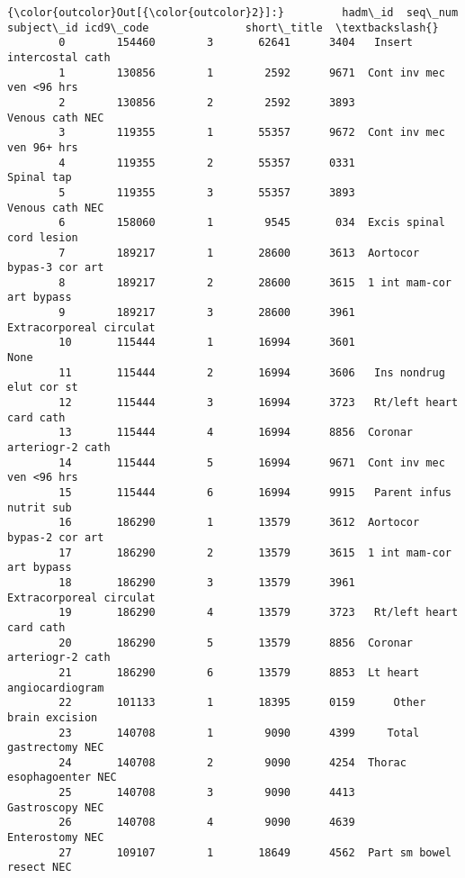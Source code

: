 \documentclass[11pt]{article}
\begin{document}
\begin{Verbatim}[commandchars=\\\{\}]
{\color{outcolor}Out[{\color{outcolor}2}]:}         hadm\_id  seq\_num  subject\_id icd9\_code               short\_title  \textbackslash{}
        0        154460        3       62641      3404   Insert intercostal cath   
        1        130856        1        2592      9671  Cont inv mec ven <96 hrs   
        2        130856        2        2592      3893           Venous cath NEC   
        3        119355        1       55357      9672  Cont inv mec ven 96+ hrs   
        4        119355        2       55357      0331                Spinal tap   
        5        119355        3       55357      3893           Venous cath NEC   
        6        158060        1        9545       034  Excis spinal cord lesion   
        7        189217        1       28600      3613  Aortocor bypas-3 cor art   
        8        189217        2       28600      3615  1 int mam-cor art bypass   
        9        189217        3       28600      3961   Extracorporeal circulat   
        10       115444        1       16994      3601                      None   
        11       115444        2       16994      3606   Ins nondrug elut cor st   
        12       115444        3       16994      3723   Rt/left heart card cath   
        13       115444        4       16994      8856  Coronar arteriogr-2 cath   
        14       115444        5       16994      9671  Cont inv mec ven <96 hrs   
        15       115444        6       16994      9915   Parent infus nutrit sub   
        16       186290        1       13579      3612  Aortocor bypas-2 cor art   
        17       186290        2       13579      3615  1 int mam-cor art bypass   
        18       186290        3       13579      3961   Extracorporeal circulat   
        19       186290        4       13579      3723   Rt/left heart card cath   
        20       186290        5       13579      8856  Coronar arteriogr-2 cath   
        21       186290        6       13579      8853  Lt heart angiocardiogram   
        22       101133        1       18395      0159      Other brain excision   
        23       140708        1        9090      4399     Total gastrectomy NEC   
        24       140708        2        9090      4254  Thorac esophagoenter NEC   
        25       140708        3        9090      4413           Gastroscopy NEC   
        26       140708        4        9090      4639           Enterostomy NEC   
        27       109107        1       18649      4562  Part sm bowel resect NEC   

\end{Verbatim}
\end{document}
